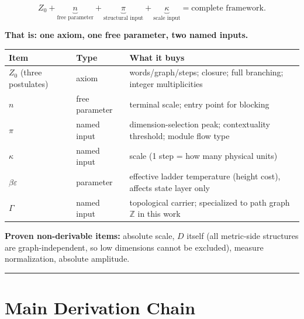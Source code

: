 \documentclass[
  11pt,
]{article}
\newcounter{none} %
\begin{document}
\[
Z_0 + \underbrace{n}_{\text{free parameter}} + \underbrace{\pi}_{\text{structural input}} + \underbrace{\kappa}_{\text{scale input}} = \text{complete framework}.
\tag{6.1}
\]

\textbf{That is: one axiom, one free parameter, two named inputs.}

{\def\LTcaptype{none} %
\begin{longtable}[]{@{}
  >{\raggedright\arraybackslash}p{}
  >{\raggedright\arraybackslash}p{}
  >{\raggedright\arraybackslash}p{}@{}}
\toprule\noalign{}
\begin{minipage}[b]{\linewidth}\raggedright
Item
\end{minipage} & \begin{minipage}[b]{\linewidth}\raggedright
Type
\end{minipage} & \begin{minipage}[b]{\linewidth}\raggedright
What it buys
\end{minipage} \\
\midrule\noalign{}
\endhead
\bottomrule\noalign{}
\endlastfoot
\(Z_0\) (three postulates) & axiom & words/graph/steps; closure; full
branching; integer multiplicities \\
\(n\) & free parameter & terminal scale; entry point for blocking \\
\(\pi\) & named input & dimension-selection peak; contextuality
threshold; module flow type \\
\(\kappa\) & named input & scale (1 step = how many physical units) \\
\(\beta\varepsilon\) & parameter & effective ladder temperature (height
cost), affects state layer only \\
\(\Gamma\) & named input & topological carrier; specialized to path
graph \(\mathbb Z\) in this work \\
\end{longtable}
}

\textbf{Proven non-derivable items:} absolute scale, \(D\) itself (all
metric-side structures are graph-independent, so low dimensions cannot
be excluded), measure normalization, absolute amplitude.

\begin{center}\rule{0.5\linewidth}{0.5pt}\end{center}

\section{Main Derivation Chain}\label{main-derivation-chain}
\end{document}

